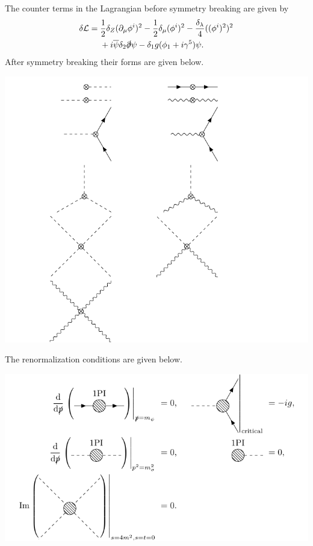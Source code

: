 \documentclass{article}
\begin{document}
The counter terms in the Lagrangian before symmetry breaking are given by
\begin{align*}
    \delta \mathcal{L} &= \frac{1}{2} \delta_Z (\partial_\mu \phi^i)^2 - \frac{1}{2} \delta_\mu (\phi^i)^2 - \frac{\delta_\lambda}{4} ((\phi^i)^2)^2 \\
    &\phantom{{}={}} + i\overline{\psi} \delta_2 \slashed{\partial} \psi - \delta_1 g(\phi_1 + i\gamma^5) \psi.
\end{align*}
After symmetry breaking their forms are given below.
\begin{center}
    \includegraphics[width=.75\linewidth]{img/yukawa/counter/counter.pdf}
\end{center}
The renormalization conditions are given below.
\begin{center}
    \includegraphics{img/yukawa/counter/rc.pdf}
\end{center}
\end{document}
